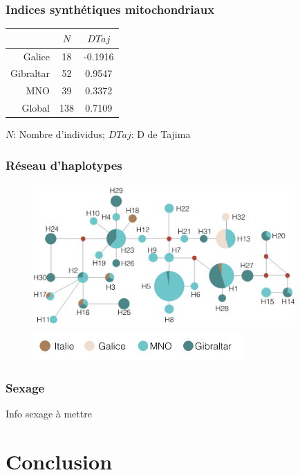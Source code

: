 \documentclass[10pt,xcolor=table]{beamer}\usepackage[]{graphicx}\usepackage[]{color}
\begin{document}
\begin{frame}
	\frametitle{Indices synthétiques mitochondriaux}
\begin{table}[!]
\centering
\begin{tabular}{rcc}
\hline
 & $N$	& $D Taj$\\
\hline
Galice &	18	 & -0.1916	\\
Gibraltar &	52	& 0.9547	\\
MNO &	39		& 0.3372 \\
\hline
Global &	138	&	0.7109	\\
\hline
\end{tabular}
\end{table}	
\centering $N$: Nombre d'individus; $D Taj$: D de Tajima
\end{frame}

\begin{frame}
	\frametitle{Réseau d'haplotypes}
	\begin{figure}
		\begin{center}
		\includegraphics[width=10cm]{reseau}\\[0.5cm]
		\includegraphics[width=8cm]{totalleg}
		\end{center}
	\end{figure}
\end{frame}

\begin{frame}
	\frametitle{Sexage}
Info sexage à mettre
\end{frame}

\section{Conclusion}
\end{document}
